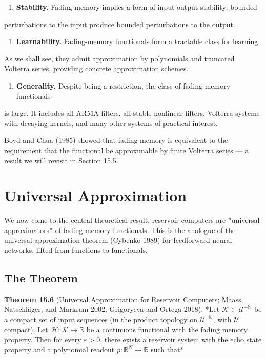 \begin{enumerate}[nosep]
  \item \textbf{Stability.} Fading memory implies a form of input-output stability: bounded
\end{enumerate}
   perturbations to the input produce bounded perturbations to the output.

\begin{enumerate}[nosep]
  \item \textbf{Learnability.} Fading-memory functionals form a tractable class for learning.
\end{enumerate}
   As we shall see, they admit approximation by polynomials and truncated Volterra
   series, providing concrete approximation schemes.

\begin{enumerate}[nosep]
  \item \textbf{Generality.} Despite being a restriction, the class of fading-memory functionals
\end{enumerate}
   is large. It includes all ARMA filters, all stable nonlinear filters, Volterra
   systems with decaying kernels, and many other systems of practical interest.

Boyd and Chua (1985) showed that fading memory is equivalent to the requirement
that the functional be approximable by finite Volterra series --- a result we will
revisit in Section 15.5.


\bigskip


\section{Universal Approximation}\label{sec:15.3}

We now come to the central theoretical result: reservoir computers are *universal
approximators* of fading-memory functionals. This is the analogue of the universal
approximation theorem (Cybenko 1989) for feedforward neural networks, lifted from
functions to functionals.

\subsection{The Theorem}\label{sec:15.3.1}

\textbf{Theorem 15.6} (Universal Approximation for Reservoir Computers; Maass, Natschläger,
and Markram 2002; Grigoryeva and Ortega 2018). *Let $\mathcal{K} \subset \mathcal{U}^{-\mathbb{N}}$
be a compact set of input sequences (in the product topology on $\mathcal{U}^{-\mathbb{N}}$,
with $\mathcal{U}$ compact). Let $\mathcal{H}: \mathcal{K} \to \mathbb{R}$ be a
continuous functional with the fading memory property. Then for every $\varepsilon > 0$,
there exists a reservoir system with the echo state property and a polynomial readout
$p: \mathbb{R}^N \to \mathbb{R}$ such that*

